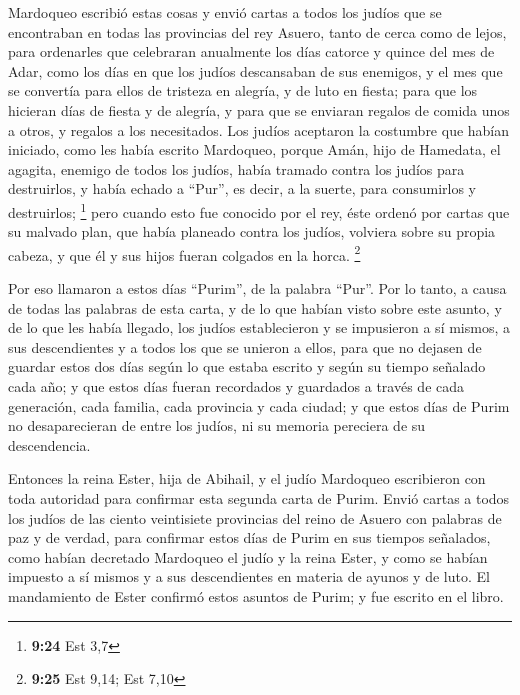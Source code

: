  Mardoqueo escribió estas cosas y envió cartas a todos
los judíos que se encontraban en todas las provincias del rey Asuero,
tanto de cerca como de lejos,  para ordenarles que
celebraran anualmente los días catorce y quince del mes de Adar,
 como los días en que los judíos descansaban de sus
enemigos, y el mes que se convertía para ellos de tristeza en alegría, y
de luto en fiesta; para que los hicieran días de fiesta y de alegría, y
para que se enviaran regalos de comida unos a otros, y regalos a los
necesitados.  Los judíos aceptaron la costumbre que
habían iniciado, como les había escrito Mardoqueo, 
porque Amán, hijo de Hamedata, el agagita, enemigo de todos los judíos,
había tramado contra los judíos para destruirlos, y había echado a
``Pur'', es decir, a la suerte, para consumirlos y destruirlos;
\footnote{\textbf{9:24} Est 3,7}  pero cuando esto fue
conocido por el rey, éste ordenó por cartas que su malvado plan, que
había planeado contra los judíos, volviera sobre su propia cabeza, y que
él y sus hijos fueran colgados en la horca. \footnote{\textbf{9:25} Est
  9,14; Est 7,10}

 Por eso llamaron a estos días ``Purim'', de la palabra
``Pur''. Por lo tanto, a causa de todas las palabras de esta carta, y de
lo que habían visto sobre este asunto, y de lo que les había llegado,
 los judíos establecieron y se impusieron a sí mismos, a
sus descendientes y a todos los que se unieron a ellos, para que no
dejasen de guardar estos dos días según lo que estaba escrito y según su
tiempo señalado cada año;  y que estos días fueran
recordados y guardados a través de cada generación, cada familia, cada
provincia y cada ciudad; y que estos días de Purim no desaparecieran de
entre los judíos, ni su memoria pereciera de su descendencia.

 Entonces la reina Ester, hija de Abihail, y el judío
Mardoqueo escribieron con toda autoridad para confirmar esta segunda
carta de Purim.  Envió cartas a todos los judíos de las
ciento veintisiete provincias del reino de Asuero con palabras de paz y
de verdad,  para confirmar estos días de Purim en sus
tiempos señalados, como habían decretado Mardoqueo el judío y la reina
Ester, y como se habían impuesto a sí mismos y a sus descendientes en
materia de ayunos y de luto.  El mandamiento de Ester
confirmó estos asuntos de Purim; y fue escrito en el libro.

